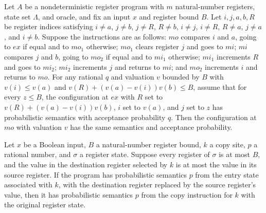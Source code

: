 \begin{theorem}
\label{Complexity.LogProg.psem_mul}
\leanok
{}
Let $A$ be a nondeterministic register program with $m$ natural-number registers, state
set $\Lambda$, and oracle, and fix an input $x$ and register bound $B$. Let $i,j,a,b,R$
be register indices satisfying $i\ne a$, $j\ne b$, $j\ne R$, $R\ne b$, $i\ne j$, $i\ne
R$, $R\ne a$, $j\ne a$, and $i\ne b$. Suppose the instructions are as follows: $mo$
compares $i$ and $a$, going to $ex$ if equal and to $mo_1$ otherwise; $mo_1$ clears
register $j$ and goes to $mi$; $mi$ compares $j$ and $b$, going to $mo_2$ if equal and
to $mi_1$ otherwise; $mi_1$ increments $R$ and goes to $mi_2$; $mi_2$ increments $j$ and
returns to $mi$; and $mo_2$ increments $i$ and returns to $mo$. For any rational $q$ and
valuation $v$ bounded by $B$ with $v(i)\le v(a)$ and $v(R)+(v(a)-v(i))v(b)\le B$, assume
that for every $z\le B$, the configuration at $ex$ with $R$ set to
$v(R)+(v(a)-v(i))v(b)$, $i$ set to $v(a)$, and $j$ set to $z$ has probabilistic
semantics with acceptance probability $q$. Then the configuration at $mo$ with valuation
$v$ has the same semantics and acceptance probability.
\end{theorem}

\begin{lemma}
\label{Complexity.LogProg.ups_cp}
\leanok
{}
Let $x$ be a Boolean input, $B$ a natural-number register bound, $k$ a copy site, $p$ a
rational number, and $\sigma$ a register state. Suppose every register of $\sigma$ is at
most $B$, and the value in the destination register selected by $k$ is at most the value
in its source register. If the program has probabilistic semantics $p$ from the entry
state associated with $k$, with the destination register replaced by the source
register’s value, then it has probabilistic semantics $p$ from the copy instruction for
$k$ with the original register state.
\end{lemma}

